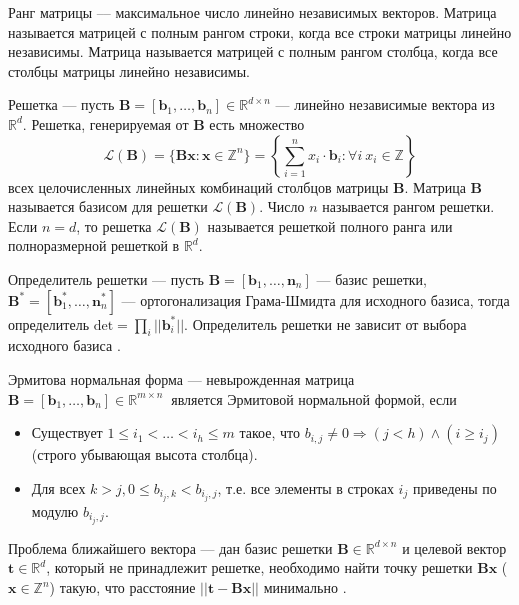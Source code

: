 Ранг матрицы –-- максимальное число линейно независимых векторов. Матрица называется матрицей с полным рангом строки, когда все строки матрицы линейно независимы. Матрица называется матрицей с полным рангом столбца, когда все столбцы матрицы линейно независимы.

Решетка --- пусть $ \mathbf{B} = [\mathbf{b}_1, \ldots, \mathbf{b}_n] \in \mathbb{R}^{d \times n} $ --- линейно независимые вектора из $ \mathbb{R}^d $. Решетка, генерируемая от $\mathbf{B}$ есть множество $$ \mathcal{L}(\mathbf{B}) = \lbrace \mathbf{Bx}: \mathbf{x} \in \mathbb{Z}^n \rbrace = \left\{ \sum\limits_{i=1}^n x_i \cdot \mathbf{b}_i: \forall i \ x_i \in \mathbb{Z} \right\} $$
всех целочисленных линейных комбинаций столбцов матрицы $\mathbf{B}$. Матрица $\mathbf{B}$ называется базисом для решетки $\mathcal{L}(\mathbf{B})$. Число $n$ называется рангом решетки. Если $n = d$, то решетка $\mathcal{L}(\mathbf{B})$ называется решеткой полного ранга или полноразмерной решеткой в $\mathbb{R}^d$. 

Определитель решетки --- пусть $ \mathbf{B} = \left[\mathbf{b}_1, \ldots, \mathbf{n}_n \right] $ --- базис решетки, $ \mathbf{B}^* = \left[\mathbf{b}^*_1, \ldots, \mathbf{n}^*_n \right] $ --- ортогонализация Грама-Шмидта для исходного базиса, тогда определитель $\mathrm{det} = \prod_i ||\mathbf{b}^*_i||$. Определитель решетки не зависит от выбора исходного базиса \cite{lec1}. 

Эрмитова нормальная форма \cite{lec4} --- невырожденная матрица $ \mathbf{B}=\left[\mathbf{b}_1, \ldots, \mathbf{b}_n\right] \in \mathbb{R}^{m \times n}\ $ является Эрмитовой нормальной формой, если

\begin{itemize}
\item Существует $ 1 \le i_1 < \ldots < i_h \le m $ такое, что $ b_{i,j} \neq 0 \Rightarrow (j < h) \land (i \geq i_j) $ (строго убывающая высота столбца).
\item Для всех $ k>j, 0 \le b_{{i_j,k}}<b_{i_j,j} $, т.е. все элементы в строках $ i_j $ приведены по модулю $ b_{i_j, j} $.
\end{itemize}

Проблема ближайшего вектора --- дан базис решетки $ \mathbf{B} \in \mathbb{R}^{d \times n} $ и целевой вектор $ \mathbf{t} \in \mathbb{R}^d $, который не принадлежит решетке, необходимо найти точку решетки $ \mathbf{Bx} $ ($ \mathbf{x} \in \mathbb{Z}^n $) такую, что расстояние $ ||\mathbf{t} - \mathbf{Bx}|| $ минимально \cite{lec4}. 

